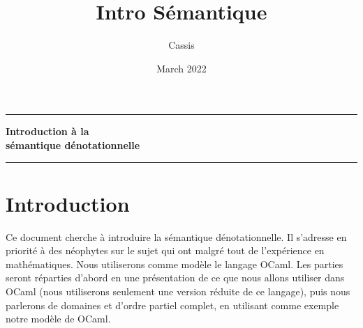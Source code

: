 \documentclass[11pt,french]{article}
\title{Intro Sémantique}
\author{Cassis}
\date{March 2022}
\begin{document}
\setlength{\unitlength}{1cm}

\date{}

\thispagestyle{empty}

\vspace{0.5cm}

\begin{center}

	\vspace{1.5cm}

	\rule[11pt]{9.5cm}{0.5pt}

	\textbf{\huge Introduction à la \\ sémantique dénotationnelle}

	\vspace{0.2cm}

	\text{}

	\vspace{0.2cm}



	\rule{9.5cm}{0.5pt}

	\vspace{8cm}

\end{center}

\section*{Introduction}

Ce document cherche à introduire la sémantique dénotationnelle. Il s'adresse en priorité à des néophytes sur le sujet qui ont malgré tout de l'expérience en mathématiques. Nous utiliserons comme modèle le langage OCaml. Les parties seront réparties d'abord en une présentation de ce que nous allons utiliser dans OCaml (nous utiliserons seulement une version réduite de ce langage), puis nous parlerons de domaines et d'ordre partiel complet, en utilisant comme exemple notre modèle de OCaml.

\vspace{\baselineskip}

\vfill

\date{}

\newpage
\thispagestyle{empty}
\tableofcontents
\vspace{5cm}

\vfill \hfill
\newpage \setcounter{page}{1}






\end{document}

